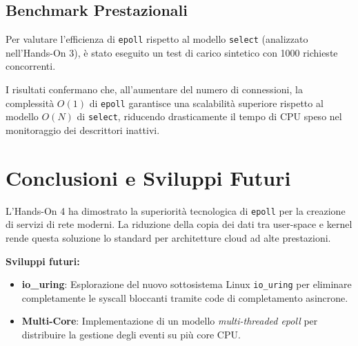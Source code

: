 \documentclass[a4paper,12pt]{article}
\begin{document}
\subsection{Benchmark Prestazionali}
Per valutare l'efficienza di \texttt{epoll} rispetto al modello \texttt{select} (analizzato nell'Hands-On 3), è stato eseguito un test di carico sintetico con 1000 richieste concorrenti.
I risultati confermano che, all'aumentare del numero di connessioni, la complessità $O(1)$ di \texttt{epoll} garantisce una scalabilità superiore rispetto al modello $O(N)$ di \texttt{select}, riducendo drasticamente il tempo di CPU speso nel monitoraggio dei descrittori inattivi.

\section{Conclusioni e Sviluppi Futuri}
L'Hands-On 4 ha dimostrato la superiorità tecnologica di \texttt{epoll} per la creazione di servizi di rete moderni. La riduzione della copia dei dati tra user-space e kernel rende questa soluzione lo standard per architetture cloud ad alte prestazioni.

\noindent \textbf{Sviluppi futuri:}
\begin{itemize}
    \item \textbf{io_uring}: Esplorazione del nuovo sottosistema Linux \texttt{io_uring} per eliminare completamente le syscall bloccanti tramite code di completamento asincrone.
    \item \textbf{Multi-Core}: Implementazione di un modello \textit{multi-threaded epoll} per distribuire la gestione degli eventi su più core CPU.
\end{itemize}
\end{document}
